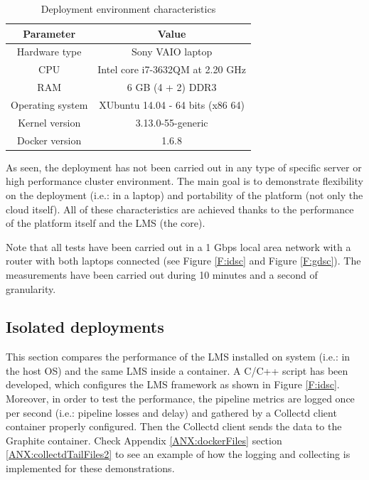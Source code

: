 \begin{table}[htb]
\caption{Deployment environment characteristics}
\begin{center}
\begin{tabular}{|c|c|}
\hline
{\bf Parameter} & {\bf Value} \\ \hline \hline
Hardware type        & Sony VAIO laptop \\ \hline
CPU        & Intel core i7-3632QM at 2.20 GHz  \\ \hline
RAM        & 6 GB (4 + 2) DDR3 \\ \hline
Operating system        & XUbuntu 14.04 - 64 bits (x86 64)  \\ \hline
Kernel version        & 3.13.0-55-generic  \\ \hline
Docker version        & 1.6.8  \\ \hline
\end{tabular}
\label{T:dec}
\end{center}
\end{table}

As seen, the deployment has not been carried out in any type of specific server or high performance cluster environment. The main goal is to demonstrate flexibility on the deployment (i.e.: in a laptop) and portability of the platform (not only the cloud itself). All of these characteristics are achieved thanks to the performance of the platform itself and the LMS (the core).

Note that all tests have been carried out in a 1 Gbps local area network with a router with both laptops connected (see Figure \ref{F:idsc} and Figure \ref{F:gdsc}). The measurements have been carried out during 10 minutes and a second of granularity.

\subsection{Isolated deployments}

This section compares the performance of the LMS installed on system (i.e.: in the host OS) and the same LMS inside a container. A C/C++ script has been developed, which configures the LMS framework as shown in Figure \ref{F:idsc}. Moreover, in order to test the performance, the pipeline metrics are logged once per second (i.e.: pipeline losses and delay) and gathered by a Collectd client container properly configured. Then the Collectd client sends the data to the Graphite container. Check Appendix \ref{ANX:dockerFiles} section \ref{ANX:collectdTailFiles2} to see an example of how the logging and collecting is implemented for these demonstrations. 

